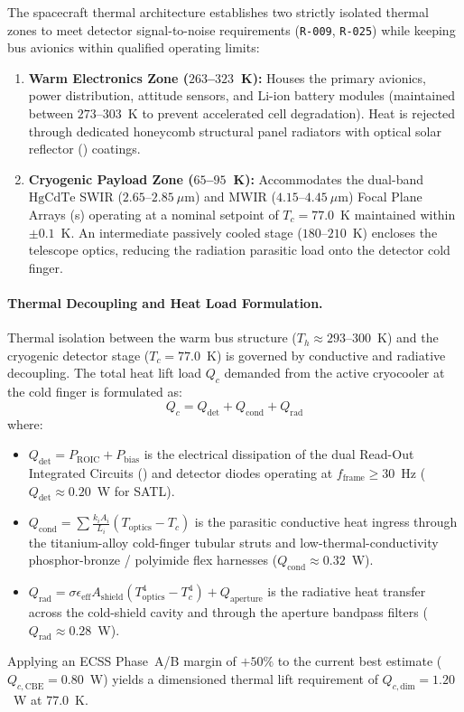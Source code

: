 The spacecraft thermal architecture establishes two strictly isolated thermal zones to meet detector signal-to-noise requirements (\texttt{R-009}, \texttt{R-025}) while keeping bus avionics within qualified operating limits:
\begin{enumerate}
    \item \textbf{Warm Electronics Zone ($263$--$323$~K):} Houses the primary avionics, power distribution, attitude sensors, and $\mathrm{Li\text{-}ion}$ battery modules (maintained between $273$--$303$~K to prevent accelerated cell degradation). Heat is rejected through dedicated honeycomb structural panel radiators with optical solar reflector () coatings.
    \item \textbf{Cryogenic Payload Zone ($65$--$95$~K):} Accommodates the dual-band $\mathrm{HgCdTe}$ SWIR ($2.65\text{--}2.85~\mu\mathrm{m}$) and MWIR ($4.15\text{--}4.45~\mu\mathrm{m}$) Focal Plane Arrays (s) operating at a nominal setpoint of $T_c = 77.0$~K maintained within $\pm 0.1$~K. An intermediate passively cooled stage ($180$--$210$~K) encloses the telescope optics, reducing the radiation parasitic load onto the detector cold finger.
\end{enumerate}

\paragraph{Thermal Decoupling and Heat Load Formulation.}
Thermal isolation between the warm bus structure ($T_h \approx 293\text{--}300$~K) and the cryogenic detector stage ($T_c = 77.0$~K) is governed by conductive and radiative decoupling. The total heat lift load $Q_c$ demanded from the active cryocooler at the cold finger is formulated as:
\begin{equation}
    Q_c = Q_{\text{det}} + Q_{\text{cond}} + Q_{\text{rad}}
    \label{eq:cryo_heat_lift}
\end{equation}
where:
\begin{itemize}
    \item $Q_{\text{det}} = P_{\text{ROIC}} + P_{\text{bias}}$ is the electrical dissipation of the dual Read-Out Integrated Circuits () and detector diodes operating at $f_{\text{frame}} \ge 30$~Hz ($Q_{\text{det}} \approx 0.20$~W for SATL).
    \item $Q_{\text{cond}} = \sum \frac{k_i A_i}{L_i} (T_{\text{optics}} - T_c)$ is the parasitic conductive heat ingress through the titanium-alloy cold-finger tubular struts and low-thermal-conductivity phosphor-bronze / polyimide flex harnesses ($Q_{\text{cond}} \approx 0.32$~W).
    \item $Q_{\text{rad}} = \sigma \epsilon_{\text{eff}} A_{\text{shield}} (T_{\text{optics}}^4 - T_c^4) + Q_{\text{aperture}}$ is the radiative heat transfer across the cold-shield cavity and through the aperture bandpass filters ($Q_{\text{rad}} \approx 0.28$~W).
\end{itemize}
Applying an ECSS Phase~A/B margin of $+50\%$ to the current best estimate ($Q_{c,\text{CBE}} = 0.80$~W) yields a dimensioned thermal lift requirement of $Q_{c,\text{dim}} = 1.20$~W at $77.0$~K.

